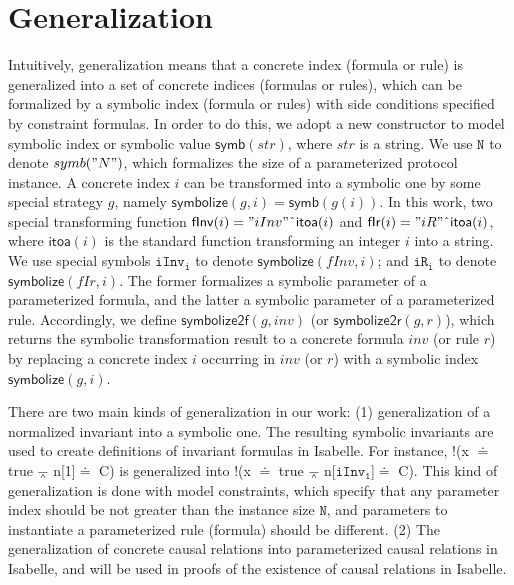 \documentclass[conference]{IEEEtran}
\def \andc {\barwedge }
\def \negc {!}
\def \cat {\symbol{94}}
\def \iInv {iInv}
\def \iR {iR}
\newcommand\cai[1]{\textcolor{blue}{ #1} }
\begin{document}
{\section{Generalization}\label{sec:generalization}
Intuitively, generalization means that a concrete index (formula or rule) is generalized into a set of concrete indices (formulas or rules), which can be formalized  by a symbolic index (formula or rules) with side conditions  specified by   constraint formulas.     In order to do this, we  adopt a new constructor  to model symbolic index or symbolic value $\mathsf{symb}(str)$, where $str$ is   a string.  We use $\mathtt{N}$ to denote $symb("N")$, which formalizes the size of a parameterized protocol instance. A concrete index $i$ can be transformed into a symbolic one by some special strategy $g$, namely  $\mathsf{symbolize}(g,i)=\mathsf{symb}(g(i))$. In this work, two special transforming function $\mathsf{fInv}(i)="iInv"\cat \mathsf{itoa}(i)$ and $\mathsf{fIr}(i)="iR"\cat \mathsf{itoa}(i)$, where $\mathsf{itoa}(i)$ is the standard function transforming an integer $i$ into a string. We use  special symbols $\mathtt{\iInv_i}$  to denote $\mathsf{symbolize}(fInv,i)$;  and $\mathtt{\iR_i}$ to denote $\mathsf{symbolize}(fIr,i)$. The former formalizes a symbolic parameter of a parameterized   formula, and the latter    a symbolic  parameter of a parameterized rule. Accordingly, we define $\mathsf{symbolize2f}(g,inv)$ (or  $\mathsf{symbolize2r}(g,r)$), which returns the symbolic transformation result to a concrete formula $inv$ (or rule $r$) by replacing a concrete index $i$ occurring in $inv$ (or $r$) with a symbolic index $\mathsf{symbolize}(g,i)$.


There are two
main kinds of generalization in our work: (1) generalization of a normalized invariant into a symbolic one. %
The resulting symbolic invariants are used to create definitions of invariant formulas in Isabelle. For instance,  $\negc$(x $\doteq$ true $\andc$ n[1]$\doteq$ C) is generalized into $\negc$(x $\doteq$ true $\andc$ n[$\mathtt{\iInv_1}$]$\doteq$ C).  This kind of generalization is done with model constraints, which  specify  that any parameter index should be not greater than the instance size $\mathtt{N}$, and parameters to instantiate a parameterized rule (formula) should be different. (2) The generalization of concrete causal relations into parameterized causal relations in Isabelle, and will be used in proofs of the existence  of causal relations in Isabelle.


}
\end{document}
